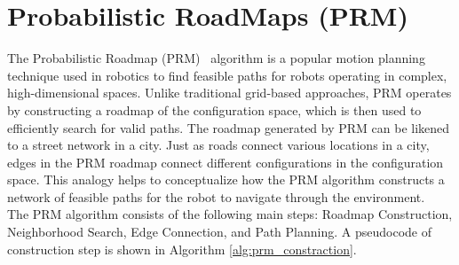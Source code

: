 \documentclass{ctuthesis}
\begin{document}
\section{Probabilistic RoadMaps (PRM)}
The Probabilistic Roadmap (PRM)~\cite{Kavraki1996PRM} algorithm is a 
popular motion planning technique used in robotics to find feasible paths 
for robots operating in complex, high-dimensional spaces. 
Unlike traditional grid-based approaches, 
PRM operates by constructing a roadmap of the configuration space, 
which is then used to efficiently search for valid paths.
The roadmap generated by PRM can be likened to a street network in a city. 
Just as roads connect various locations in a city, 
edges in the PRM roadmap connect different configurations in the configuration space. 
This analogy helps to conceptualize how the PRM algorithm constructs a network of 
feasible paths for the robot to navigate through the environment.\\[12pt]
The PRM algorithm consists of the following main steps: 
Roadmap Construction, Neighborhood Search, Edge Connection, and Path Planning.
A pseudocode of construction step is shown in Algorithm \ref{alg:prm_constraction}.
\end{document}
